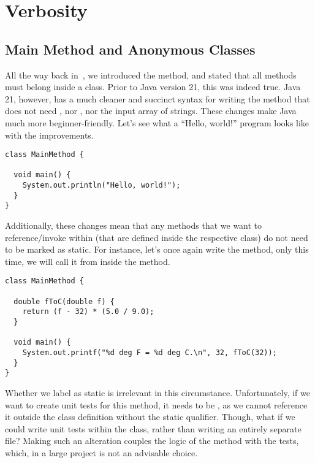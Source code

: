 \section{Verbosity}

\subsection{Main Method and Anonymous Classes}
All the way back in~, we introduced the  method, and stated that all methods must belong inside a class. 
Prior to Java version 21, this was indeed true. 
Java 21, however, has a much cleaner and succinct syntax for writing the  method that does not need , nor , nor the input array of strings. 
These changes make Java much more beginner-friendly. 
Let's see what a ``Hello, world!'' program looks like with the improvements.

\begin{lstlisting}[language=MyJava]
class MainMethod {
  
  void main() {
    System.out.println("Hello, world!");
  }
}
\end{lstlisting}

Additionally, these changes mean that any methods that we want to reference/invoke within  (that are defined inside the respective class) do not need to be marked as static. 
For instance, let's once again write the  method, only this time, we will call it from inside the  method.

\begin{lstlisting}[language=MyJava]
class MainMethod {

  double fToC(double f) {
    return (f - 32) * (5.0 / 9.0);
  }
  
  void main() {
    System.out.printf("%d deg F = %d deg C.\n", 32, fToC(32));
  }
}
\end{lstlisting}

Whether we label  as static is irrelevant in this circumstance. 
Unfortunately, if we want to create unit tests for this method, it needs to be , as we cannot reference it outside the class definition without the static qualifier. 
Though, what if we could write unit tests within the  class, rather than writing an entirely separate file? 
Making such an alteration couples the logic of the method with the tests, which, in a large project is not an advisable choice. 


